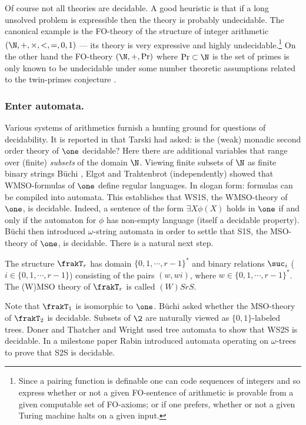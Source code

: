 Of course not all theories are decidable. A good heuristic is that if a long unsolved problem is expressible then the theory is probably undecidable. 
The canonical example is the FO-theory of the structure of integer arithmetic $(\N,+,\times,<,=,0,1)$ --- its theory is very expressive and highly undecidable.\footnote{Since a pairing function is definable one can code sequences of integers and so express whether or not a given FO-sentence of arithmetic is provable from a given computable set of FO-axioms; or if one prefers, whether or not a given Turing machine halts on a given input.}
On the other hand the FO-theory $(\N,+,\text{Pr})$ where $\text{Pr} \subset \N$ is the set of primes is only known to be undecidable
under some number theoretic assumptions related to the twin-primes conjecture \cite{BJW93}.

\subsubsection*{Enter automata.}

Various systems of arithmetics furnish a hunting ground for questions of decidability. 
It is reported in \cite{Robi58} that Tarski had asked: is the (weak) monadic second order theory of $\one$ decidable? Here there are additional variables that
range over (finite) {\em subsets} of the domain $\N$. Viewing finite subsets of $\N$ as finite binary strings B\"uchi \cite{Buch60}, Elgot \cite{Elgo61} and Trahtenbrot \cite{trah62} (independently) showed that WMSO-formulas of $\one$ define regular languages. In slogan form: formulas can be compiled into automata. This establishes that WS1S, the WMSO-theory of $\one$, is decidable. Indeed, a sentence of the form $\exists X \phi(X)$ holds in $\one$ if and only if the automaton for $\phi$ has non-empty language (itself a decidable property). B\"uchi \cite{Buch62} then introduced $\omega$-string automata in order to settle that S1S, the MSO-theory of $\one$, is decidable.
There is a natural next step.

\begin{definition}
The structure  $\frakT_r$ has domain $\{0,1, \cdots,r-1\}^\ast$ and binary relations $\suc_i$ ($i \in \{0,1, \cdots, r-1\}$) 
consisting of the pairs $(w,wi)$, where $w \in \{0,1,\cdots,r-1\}^\ast$. The (W)MSO theory of $\frakT_r$ is called $(W)SrS$. 
\end{definition}
Note that $\frakT_1$ is isomorphic to $\one$. B\"uchi \cite{Buch62} asked  whether the 
MSO-theory of $\frakT_2$ is decidable. Subsets of $\2$ are naturally viewed as $\{0,1\}$-labeled trees.
Doner \cite{Done70} and Thatcher and Wright \cite{ThWr68} used tree automata to show that WS2S is decidable. In a milestone paper Rabin \cite{Rabi69} introduced automata operating on 
$\omega$-trees to prove that S2S is decidable.

